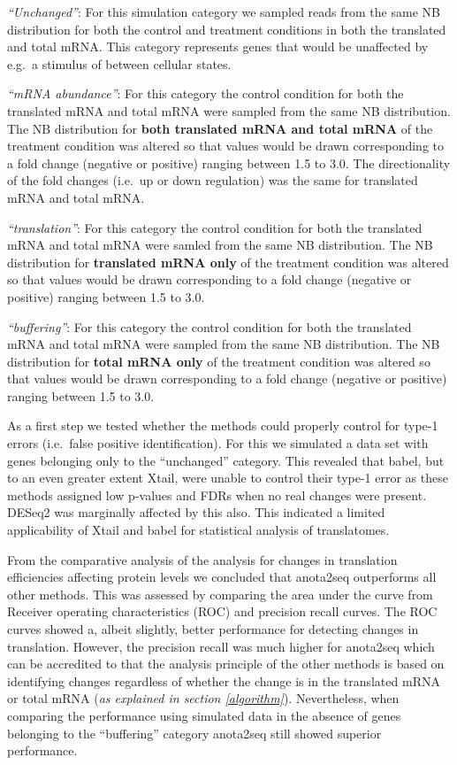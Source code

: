 \documentclass[
  12pt,
  openany]{book}
\begin{document}
\emph{``Unchanged''}: For this simulation category we sampled reads from the same NB distribution for both the control and treatment conditions in both the translated and total mRNA. This category represents genes that would be unaffected by e.g.~a stimulus of between cellular states.

\emph{``mRNA abundance''}: For this category the control condition for both the translated mRNA and total mRNA were sampled from the same NB distribution. The NB distribution for \textbf{both translated mRNA and total mRNA} of the treatment condition was altered so that values would be drawn corresponding to a fold change (negative or positive) ranging between 1.5 to 3.0. The directionality of the fold changes (i.e.~up or down regulation) was the same for translated mRNA and total mRNA.

\emph{``translation''}: For this category the control condition for both the translated mRNA and total mRNA were samled from the same NB distribution. The NB distribution for \textbf{translated mRNA only} of the treatment condition was altered so that values would be drawn corresponding to a fold change (negative or positive) ranging between 1.5 to 3.0.

\emph{``buffering''}: For this category the control condition for both the translated mRNA and total mRNA were sampled from the same NB distribution. The NB distribution for \textbf{total mRNA only} of the treatment condition was altered so that values would be drawn corresponding to a fold change (negative or positive) ranging between 1.5 to 3.0.

As a first step we tested whether the methods could properly control for type-1 errors (i.e.~false positive identification). For this we simulated a data set with genes belonging only to the ``unchanged'' category. This revealed that babel, but to an even greater extent Xtail, were unable to control their type-1 error as these methods assigned low p-values and FDRs when no real changes were present. DESeq2 was marginally affected by this also. This indicated a limited applicability of Xtail and babel for statistical analysis of translatomes.

From the comparative analysis of the analysis for changes in translation efficiencies affecting protein levels we concluded that anota2seq outperforms all other methods. This was assessed by comparing the area under the curve from Receiver operating characteristics (ROC) and precision recall curves. The ROC curves showed a, albeit slightly, better performance for detecting changes in translation. However, the precision recall was much higher for anota2seq which can be accredited to that the analysis principle of the other methods is based on identifying changes regardless of whether the change is in the translated mRNA or total mRNA (\emph{as explained in section \ref{algorithm}}). Nevertheless, when comparing the performance using simulated data in the absence of genes belonging to the ``buffering'' category anota2seq still showed superior performance.
\end{document}

